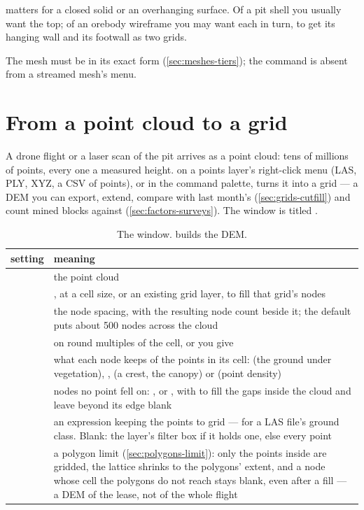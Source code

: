  matters for a closed solid or an overhanging surface. Of a pit shell you usually want the top; of an orebody wireframe you may want each in turn, to get its hanging wall and its footwall as two grids.

The mesh must be in its exact form (\cref{sec:meshes-tiers}); the command is absent from a streamed mesh's menu.

\section{From a point cloud to a grid}\label{sec:grids-points}
A drone flight or a laser scan of the pit arrives as a point cloud: tens of millions of points, every one a measured height.  on a points layer's right-click menu (LAS, PLY, XYZ, a CSV of points), or  in the command palette, turns it into a grid — a DEM you can export, extend, compare with last month's (\cref{sec:grids-cutfill}) and count mined blocks against (\cref{sec:factors-surveys}). The window is titled .

\begin{table}[htbp]
\small
\begin{tabularx}{\linewidth}{@{}lL@{}}\toprule
setting & meaning \\ \midrule
{} & the point cloud \\
 & , at a cell size, or  an existing grid layer, to fill that grid's nodes \\
 & the node spacing, with the resulting node count beside it; the default puts about 500 nodes across the cloud \\
 & on round multiples of the cell, or  you give \\
 & what each node keeps of the points in its cell:  (the ground under vegetation), ,  (a crest, the canopy) or  (point density) \\
 & nodes no point fell on: ,  or , with  to fill the gaps inside the cloud and leave beyond its edge blank \\
 & an expression keeping the points to grid —  for a LAS file's ground class. Blank: the layer's filter box if it holds one, else every point \\
 & a polygon limit (\cref{sec:polygons-limit}): only the points inside are gridded, the lattice shrinks to the polygons' extent, and a node whose cell the polygons do not reach stays blank, even after a fill — a DEM of the lease, not of the whole flight \\
\bottomrule
\end{tabularx}
\caption{The  window.  builds the DEM.}\label{tab:grids-points}
\end{table}

